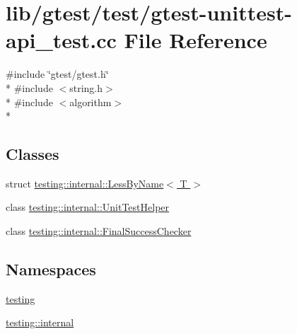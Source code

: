 \hypertarget{gtest-unittest-api__test_8cc}{\section{lib/gtest/test/gtest-\/unittest-\/api\-\_\-test.cc File Reference}
\label{gtest-unittest-api__test_8cc}
}
{\ttfamily \#include \char`\"{}gtest/gtest.\-h\char`\"{}}\\*
{\ttfamily \#include $<$string.\-h$>$}\\*
{\ttfamily \#include $<$algorithm$>$}\\*
\subsection*{Classes}
\begin{DoxyCompactItemize}
\item 
struct \hyperlink{structtesting_1_1internal_1_1_less_by_name}{testing\-::internal\-::\-Less\-By\-Name$<$ T $>$}
\item 
class \hyperlink{classtesting_1_1internal_1_1_unit_test_helper}{testing\-::internal\-::\-Unit\-Test\-Helper}
\item 
class \hyperlink{classtesting_1_1internal_1_1_final_success_checker}{testing\-::internal\-::\-Final\-Success\-Checker}
\end{DoxyCompactItemize}
\subsection*{Namespaces}
\begin{DoxyCompactItemize}
\item 
\hyperlink{namespacetesting}{testing}
\item 
\hyperlink{namespacetesting_1_1internal}{testing\-::internal}
\end{DoxyCompactItemize}
